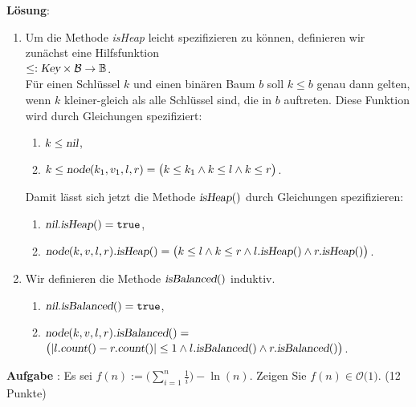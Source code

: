 \documentclass{article}
\newcounter{aufgabe}
\newcommand{\exercise}{\vspace*{0.2cm}
\stepcounter{aufgabe}

\noindent
\textbf{Aufgabe \arabic{aufgabe}}: }
\begin{document}
\noindent
\textbf{L\"osung}:
\begin{enumerate}
\item Um die Methode \textsl{isHeap} leicht spezifizieren zu k\"onnen, definieren wir zun\"achst
      eine Hilfsfunktion
      \\[0.2cm]
      \hspace*{1.3cm}
      $\leq : \textsl{Key} \times \mathcal{B} \rightarrow \mathbb{B}$.
      \\[0.2cm]
      F\"ur einen Schl\"ussel $k$ und einen bin\"aren Baum $b$ soll $k \leq b$ genau dann gelten,
      wenn $k$ kleiner-gleich als alle Schl\"ussel sind, die in $b$ auftreten.
      Diese Funktion wird durch Gleichungen spezifiziert:
      \begin{enumerate}
      \item $k \leq \textsl{nil}$,
      \item $k \leq \textsl{node}(k_1,v_1,l,r) = \bigl(k \leq k_1 \wedge k \leq l \wedge k \leq r\bigr)$.
      \end{enumerate}
      Damit l\"asst sich jetzt die Methode $\textsl{isHeap}()$ durch Gleichungen spezifizieren:
      \begin{enumerate}
      \item $\textsl{nil}.\textsl{isHeap}() = \mathtt{true}$,
      \item $\textsl{node}(k,v,l,r).\textsl{isHeap}() = 
             \bigl(k \leq l \wedge k \leq r \wedge l.\textsl{isHeap}() \wedge r.\textsl{isHeap}()\bigr)$.
      \end{enumerate}
\item Wir definieren die Methode $\textsl{isBalanced}()$ induktiv.
      \begin{enumerate}
      \item $\textsl{nil}.\textsl{isBalanced}() = \mathtt{true}$,
      \item $\textsl{node}(k,v,l,r).\textsl{isBalanced}() =$ \\[0.1cm]
            \hspace*{\fill}
            $\bigl(|l.\textsl{count}() - r.\textsl{count}()| \leq 1 
             \wedge l.\textsl{isBalanced}()\wedge r.\textsl{isBalanced}()\bigr)$.
      \end{enumerate}
\end{enumerate}
\pagebreak

\exercise
Es sei 
$f(n) := \biggl(\sum\limits_{i=1}^n \frac{1}{i}\biggr) - \ln(n)$.
Zeigen Sie $f(n)\in \mathcal{O}\bigl(1\bigr)$. \hspace*{\fill} (12 Punkte)
\end{document}
